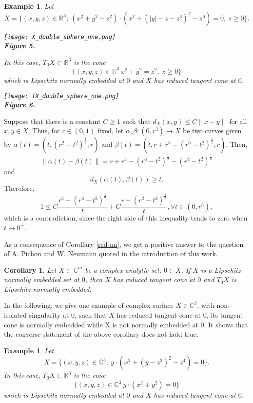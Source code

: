 \documentclass{amsart}
\makeatletter
\newtheorem{corollary}[theorem]{Corollary}
\newtheorem{example}[theorem]{Example}
\newcommand{\R}{\mathbb{R}}
\newcommand{\C}{\mathbb{C}}
\newcommand{\mlabel}[2]{\def\@currentlabel{#2}\label{#1}} %
\makeatother
\begin{document}
\begin{example}\label{3.12}
 Let $$X=\{(x,y,z)\in \R^3; \ (x^2+y^2-z^2)\cdot (x^2+(|y|-z-z^3)^2-z^6)=0, \ z\geq 0\}.$$
\begin{center}\mlabel{X_nne}{5}
\texttt{[image: X\_double\_sphere\_nne.png]}\\
{\bf Figure 5.}
\end{center}
In this case, $T_0X\subset\R^3$ is the cone
$$\{ (x,y,z)\in\R^3 \ x^2+y^2=z^2,\,\, z\geq 0\}$$
which is Lipschitz normally embedded at $0$ and $X$ has reduced tangent cone at $0$.
\begin{center}\mlabel{TX_rne}{6}
\texttt{[image: TX\_double\_sphere\_nne.png]}\\
{\bf Figure 6.}
\end{center}
\end{example}

Suppose that there is a constant $C\geq 1$ such that $d_X(x,y)\leq C\|x-y\|$ for all $x,y\in X$. Thus, for $r\in (0,1)$ fixed, let $\alpha, \beta:(0,r^3)\to X$ be two curves given by $\alpha(t)=(t,(r^2-t^2)^{\frac{1}{2}},r)$ and $\beta(t)=(t,r+r^3-(r^6-t^2)^{\frac{1}{2}},r)$. 
Then,
$$
\|\alpha(t)-\beta(t)\|=r+r^3-(r^6-t^2)^{\frac{1}{2}}-(r^2-t^2)^{\frac{1}{2}}
$$
and
$$
d_X(\alpha(t),\beta(t))\geq t.
$$
Therefore, 
$$
1\leq C\frac{r^3-(r^6-t^2)^{\frac{1}{2}}}{t}+C\frac{r-(r^2-t^2)^{\frac{1}{2}}}{t}, \forall t\in (0,r^3),
$$
which is a contradiction, since the right side of this inequality tends to zero when $t\to 0^+$.

As a consequence of Corollary \ref{red-nn}, we get a positive answer to the question of A. Pichon and W. Neumann quoted in the introduction of this work.
\begin{corollary}
 Let $X\subset\C^m$ be a complex analytic set; $0\in X$. If $X$ is a Lipschitz normally embedded set at $0$, then $X$ has reduced tangent cone at $0$ and $T_0X$ is Lipschitz normally embedded.
\end{corollary}

In the following, we give one example of complex surface $X \in \C^3$, with non-isolated singularity at $0$, such that $X$ has reduced tangent cone at $0$, its  tangent cone is normally embedded while X is not normally embedded at $0$. It shows that the converse statement of the above corollary does not hold true.

\begin{example}\label{3.14}
 Let $$X=\{(x,y,z)\in \C^3; \ y\cdot (x^2+(y-z^2)^2-z^4)=0\}.$$
In this case, $T_0X\subset\R^3$ is the cone
$$\{ (x,y,z)\in\C^3 \ y\cdot(x^2+y^2)=0\}$$
which is Lipschitz normally embedded at $0$ and $X$ has reduced tangent cone at $0$.
\end{example}
\end{document}
